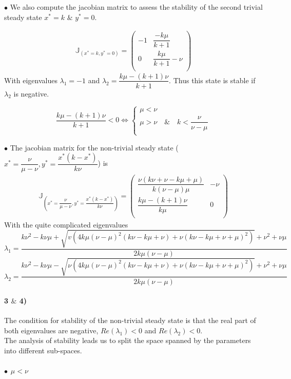 \documentclass{article}
\begin{document}
$\bullet$ We also compute the jacobian matrix to assess the stability of the second trivial steady state $x^*=k$ $\&$ $y^*=0$. 

\begin{align*}
\mathbb{J}_{(x^*=k,y^*=0)}=
\begin{pmatrix}
-1 & \dfrac{-k\mu}{k+1}  \\
0 & \dfrac{k\mu}{k+1}-\nu   \\
\end{pmatrix}
\end{align*}
With eigenvalues $\lambda_1=-1$ and $\lambda_2=\dfrac{k\mu-(k+1)\nu}{k+1}$. Thus this state is stable if $\lambda_2$ is negative.

$$
\dfrac{k\mu-(k+1)\nu}{k+1}<0
\iff
\left \{
\begin{array}{l}
 \mu<\nu \\
 \mu>\nu \quad \& \quad  k<\dfrac{\nu}{\nu-\mu} \\
 \end{array}
\right. 
$$

$\bullet$ The jacobian matrix for the non-trivial steady state ($x^*=\dfrac{\nu}{\mu-\nu},y^*=\dfrac{x^*(k-x^*)}{k\nu}$) is 
\begin{align*}
\mathbb{J}_{\left(x^*=\dfrac{\nu}{\mu-\nu},y^*=\dfrac{x^*(k-x^*)}{k\nu}\right)}=
\begin{pmatrix}
\dfrac{\nu(k\nu+\nu-k\mu +\mu)}{k(\nu-\mu)\mu} & -\nu  \\
\dfrac{k\mu-(k+1)\nu}{k\mu} & 0   \\
\end{pmatrix}
\end{align*}
With the quite complicated eigenvalues 
$$\lambda_1=\frac{k \nu^2-k \nu \mu +\sqrt{v \left(4 k \mu  (\nu-\mu )^2 (k \nu-k \mu +\nu)+\nu (k \nu-k \mu +\nu+\mu )^2\right)}+\nu^2+\nu \mu }{2 k \mu  (\nu-\mu)} $$
$$ \lambda_2=\frac{k \nu^2-k \nu \mu -\sqrt{\nu \left(4 k \mu  (\nu-\mu )^2 (k \nu-k \mu +\nu)+\nu (k \nu-k \mu +\nu+\mu )^2\right)}+\nu^2+\nu \mu }{2 k \mu  (\nu-\mu)} $$

\paragraph{3 $\&$ 4)}
The condition for stability of the non-trivial steady state is that the real part of both eigenvalues are negative, $Re(\lambda_1) <0 $ and $ Re(\lambda_2) <0$.\\ 

The analysis of stability leads us to split the space spanned by the parameters into different sub-spaces.
\subparagraph{$\bullet$ $\mu<\nu$\\}
\end{document}
